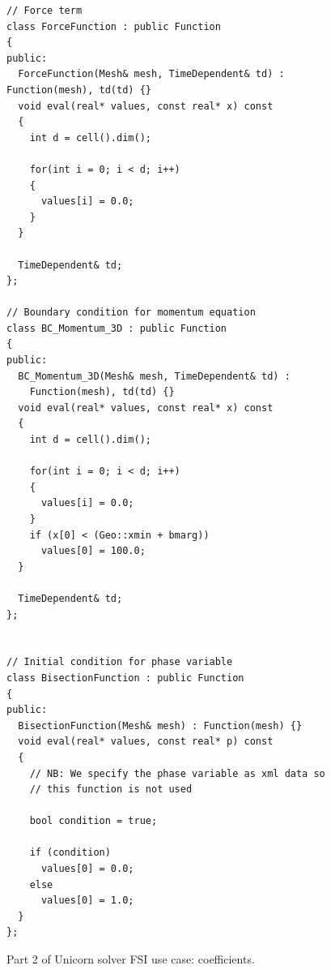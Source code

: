 \begin{figure}[!h]
\begin{lstlisting}
// Force term
class ForceFunction : public Function
{
public:
  ForceFunction(Mesh& mesh, TimeDependent& td) : Function(mesh), td(td) {}
  void eval(real* values, const real* x) const
  {
    int d = cell().dim();
    
    for(int i = 0; i < d; i++)
    {
      values[i] = 0.0;
    }
  }

  TimeDependent& td;
};

// Boundary condition for momentum equation 
class BC_Momentum_3D : public Function
{
public:
  BC_Momentum_3D(Mesh& mesh, TimeDependent& td) :
    Function(mesh), td(td) {}
  void eval(real* values, const real* x) const
  {
    int d = cell().dim();
    
    for(int i = 0; i < d; i++)
    {
      values[i] = 0.0;
    }
    if (x[0] < (Geo::xmin + bmarg))
      values[0] = 100.0;
  }
  
  TimeDependent& td;
};


// Initial condition for phase variable
class BisectionFunction : public Function
{
public:
  BisectionFunction(Mesh& mesh) : Function(mesh) {}
  void eval(real* values, const real* p) const
  {
    // NB: We specify the phase variable as xml data so
    // this function is not used

    bool condition = true;

    if (condition)
      values[0] = 0.0;
    else
      values[0] = 1.0;
  }
};
\end{lstlisting}
\caption{Part 2 of Unicorn solver FSI use case: coefficients.}
\end{figure}

